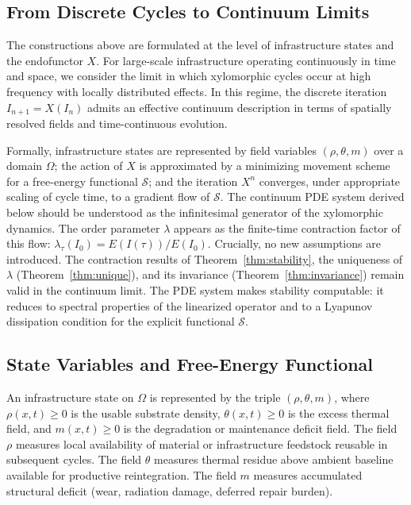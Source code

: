 \documentclass[10pt,twocolumn]{article}
\theoremstyle{plain}
\theoremstyle{definition}
\theoremstyle{remark}
\begin{document}
\subsection{From Discrete Cycles to Continuum Limits}

The constructions above are formulated at the level of infrastructure
states and the endofunctor $X$. For large-scale infrastructure
operating continuously in time and space, we consider the limit in which
xylomorphic cycles occur at high frequency with locally distributed
effects. In this regime, the discrete iteration $I_{n+1} = X(I_n)$
admits an effective continuum description in terms of spatially resolved
fields and time-continuous evolution.

Formally, infrastructure states are represented by field variables
$(\rho, \theta, m)$ over a domain $\Omega$; the action of $X$ is
approximated by a minimizing movement scheme for a free-energy
functional $\mathcal{S}$; and the iteration $X^n$ converges, under
appropriate scaling of cycle time, to a gradient flow of $\mathcal{S}$.
The continuum PDE system derived below should be understood as the
infinitesimal generator of the xylomorphic dynamics. The order
parameter $\lambda$ appears as the finite-time contraction factor of
this flow: $\lambda_\tau(I_0) = E(I(\tau))/E(I_0)$. Crucially, no new
assumptions are introduced. The contraction results of
Theorem~\ref{thm:stability}, the uniqueness of $\lambda$
(Theorem~\ref{thm:unique}), and its invariance
(Theorem~\ref{thm:invariance}) remain valid in the continuum limit.
The PDE system makes stability computable: it reduces to spectral
properties of the linearized operator and to a Lyapunov dissipation
condition for the explicit functional $\mathcal{S}$.

\subsection{State Variables and Free-Energy Functional}

An infrastructure state on $\Omega$ is represented by the triple
$(\rho, \theta, m)$, where $\rho(x,t) \geq 0$ is the usable substrate
density, $\theta(x,t) \geq 0$ is the excess thermal field, and
$m(x,t) \geq 0$ is the degradation or maintenance deficit field. The
field $\rho$ measures local availability of material or infrastructure
feedstock reusable in subsequent cycles. The field $\theta$ measures
thermal residue above ambient baseline available for productive
reintegration. The field $m$ measures accumulated structural deficit
(wear, radiation damage, deferred repair burden).
\end{document}
